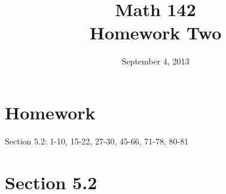 \documentclass{exam}
\author{}
\date{September 4, 2013}
\title{Math 142 \\ Homework Two}
\begin{document}
  \maketitle

  \section{Homework}
  Section 5.2: 1-10, 15-22, 27-30, 45-66, 71-78, 80-81


  \ifprintanswers
    \section{Section 5.2}
\end{document}
